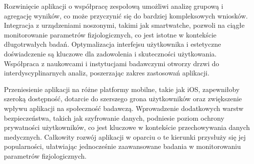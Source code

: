 Rozwinięcie aplikacji o współpracę zespołową umożliwi analizę grupową i agregację wyników, co może przyczynić się do bardziej kompleksowych wniosków. Integracja z urządzeniami noszonymi, takimi jak smartwatche, pozwoli na ciągłe monitorowanie parametrów fizjologicznych, co jest istotne w kontekście długotrwałych badań. Optymalizacja interfejsu użytkownika i estetyczne doświadczenie są kluczowe dla zadowolenia i skuteczności użytkowania. Współpraca z naukowcami i instytucjami badawczymi otworzy drzwi do interdyscyplinarnych analiz, poszerzając zakres zastosowań aplikacji.

Przeniesienie aplikacji na różne platformy mobilne, takie jak iOS, zapewniłoby szeroką dostępność, dotarcie do szerszego grona użytkowników oraz zwiększenie wpływu aplikacji na społeczność badawczą. Wprowadzenie dodatkowych warstw bezpieczeństwa, takich jak szyfrowanie danych, podniesie poziom ochrony prywatności użytkowników, co jest kluczowe w kontekście przechowywania danych medycznych. Całkowity rozwój aplikacji w oparciu o te kierunki przysłuży się jej popularności, ułatwiając jednocześnie zaawansowane badania w monitorowaniu parametrów fizjologicznych.